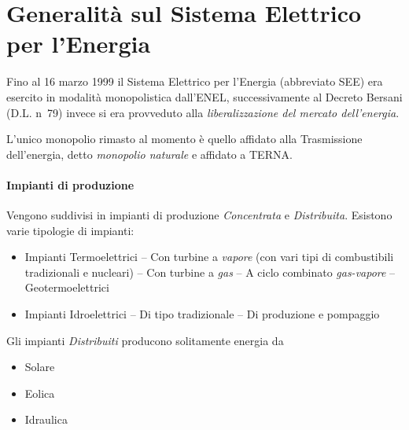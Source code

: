 \section{Generalità sul Sistema Elettrico per l'Energia}
Fino al 16 marzo 1999 il Sistema Elettrico per l'Energia (abbreviato SEE) era esercito in modalità
monopolistica dall'ENEL, successivamente al Decreto Bersani (D.L. n\textdegree\ 79) invece
si era provveduto alla \textit{liberalizzazione del mercato dell'energia}.

L'unico monopolio rimasto al momento è quello affidato alla Trasmissione dell'energia, detto
\textit{monopolio naturale} e affidato a TERNA.

\paragraph{Impianti di produzione}
Vengono suddivisi in impianti di produzione \textit{Concentrata} e \textit{Distribuita}.
Esistono varie tipologie di impianti:
\begin{itemize}
\item Impianti Termoelettrici
\subitem -- Con turbine a \textit{vapore} (con vari tipi di combustibili tradizionali e nucleari)
\subitem -- Con turbine a \textit{gas}
\subitem -- A ciclo combinato \textit{gas-vapore}
\subitem -- Geotermoelettrici
\item Impianti Idroelettrici
\subitem -- Di tipo tradizionale
\subitem -- Di produzione e pompaggio
\end{itemize}

Gli impianti \textit{Distribuiti} producono solitamente energia da 
\begin{itemize}
\item Solare
\item Eolica
\item Idraulica
\end{itemize}

